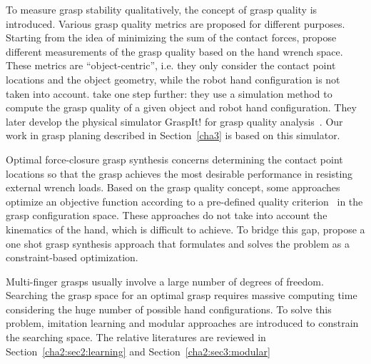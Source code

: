 To measure grasp stability qualitatively, the concept of grasp quality is introduced. Various grasp quality metrics are proposed for different purposes. Starting from the idea of minimizing the sum of the contact forces, \citep{li1988task,kirkpatrick1992quantitative, ferrari1992planning} propose different measurements of the grasp quality based on the hand wrench space.
These metrics are ``object-centric'', i.e. they only consider the contact point locations and the object geometry, while the robot hand configuration is not taken into account. \citet{miller1999examples} take one step further: they use a simulation method to compute the grasp quality of a given object and robot hand configuration. They later develop the physical simulator GraspIt! for grasp quality analysis~\citep{miller2004graspit}. Our work in grasp planing described in Section~\ref{cha3} is based on this simulator.

Optimal force-closure grasp synthesis concerns determining the contact point locations so that the grasp achieves the most desirable performance in resisting external wrench loads.
Based on the grasp quality concept, some approaches optimize an objective function according to a pre-defined quality criterion~\citep{Zhu2003,Zhu04} in the grasp configuration space.
These approaches do not take into account the kinematics of the hand, which is difficult to achieve. To bridge this gap, \citet{S.ElKhoury2012} propose a one shot grasp synthesis approach that formulates and solves the problem as a constraint-based optimization.

Multi-finger grasps usually involve a large number of degrees of freedom.
Searching the grasp space for an optimal grasp requires massive computing time considering the huge number of possible hand configurations. To solve this problem, imitation learning and modular approaches are introduced to constrain the searching space. The relative literatures are reviewed in Section~\ref{cha2:sec2:learning} and Section~\ref{cha2:sec3:modular}


